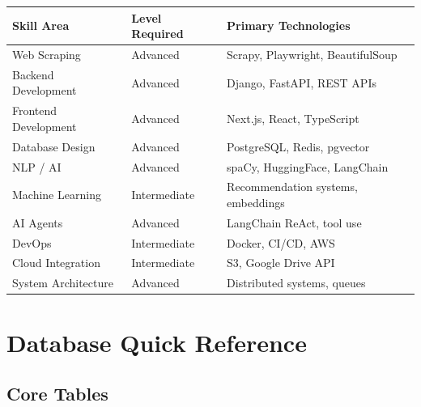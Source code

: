 \documentclass[12pt,a4paper]{report}
\begin{document}
\begin{center}
\begin{tabular}{lll}
\toprule
\textbf{Skill Area} & \textbf{Level Required} & \textbf{Primary Technologies} \\
\midrule
Web Scraping         & Advanced      & Scrapy, Playwright, BeautifulSoup \\
Backend Development  & Advanced      & Django, FastAPI, REST APIs \\
Frontend Development & Advanced      & Next.js, React, TypeScript \\
Database Design      & Advanced      & PostgreSQL, Redis, pgvector \\
NLP / AI             & Advanced      & spaCy, HuggingFace, LangChain \\
Machine Learning     & Intermediate  & Recommendation systems, embeddings \\
AI Agents            & Advanced      & LangChain ReAct, tool use \\
DevOps               & Intermediate  & Docker, CI/CD, AWS \\
Cloud Integration    & Intermediate  & S3, Google Drive API \\
System Architecture  & Advanced      & Distributed systems, queues \\
\bottomrule
\end{tabular}
\end{center}

\chapter{Database Quick Reference}

\section{Core Tables}
\end{document}
